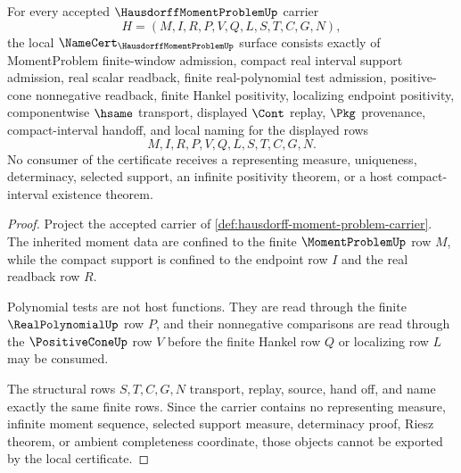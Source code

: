 \begin{theorem}
\label{thm:hausdorff-moment-problem-namecert-obligations}
For every accepted $\HausdorffMomentProblemUp$ carrier
$$
H=(M,I,R,P,V,Q,L,S,T,C,G,N),
$$
the local $\NameCert_{\HausdorffMomentProblemUp}$ surface consists exactly of MomentProblem finite-window admission, compact real interval support admission, real scalar readback, finite real-polynomial test admission, positive-cone nonnegative readback, finite Hankel positivity, localizing endpoint positivity, componentwise $\hsame$ transport, displayed $\Cont$ replay, $\Pkg$ provenance, compact-interval handoff, and local naming for the displayed rows
$$
M,I,R,P,V,Q,L,S,T,C,G,N .
$$
No consumer of the certificate receives a representing measure, uniqueness, determinacy, selected support, an infinite positivity theorem, or a host compact-interval existence theorem.
\end{theorem}
\begin{proof}
Project the accepted carrier of \autoref{def:hausdorff-moment-problem-carrier}. The inherited moment data are confined to the finite $\MomentProblemUp$ row $M$, while the compact support is confined to the endpoint row $I$ and the real readback row $R$.

Polynomial tests are not host functions. They are read through the finite $\RealPolynomialUp$ row $P$, and their nonnegative comparisons are read through the $\PositiveConeUp$ row $V$ before the finite Hankel row $Q$ or localizing row $L$ may be consumed.

The structural rows $S,T,C,G,N$ transport, replay, source, hand off, and name exactly the same finite rows. Since the carrier contains no representing measure, infinite moment sequence, selected support measure, determinacy proof, Riesz theorem, or ambient completeness coordinate, those objects cannot be exported by the local certificate.
\end{proof}


